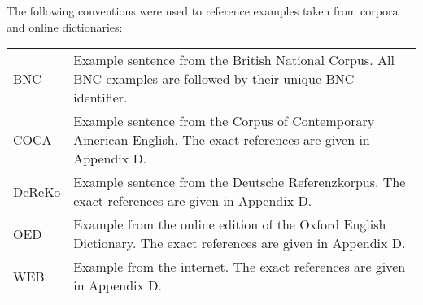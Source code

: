 
The following conventions were used to reference examples taken from corpora and online dictionaries:

\begin{table}[h]
\begin{tabular}{lp{9.5cm}} 
BNC        &    Example sentence from the British National Corpus. All BNC examples are followed by their unique BNC identifier. \\
COCA        &    Example sentence from the Corpus of Contemporary American English. The exact references are given in Appendix D.\\
DeReKo        &    Example sentence from the Deutsche Referenzkorpus. The exact references are given in Appendix D.\\
OED       &    Example from the online edition of the Oxford English Dictionary. The exact references are given in Appendix D. \\
WEB&Example from the internet. The exact references are given in Appendix D.
\end{tabular}
\end{table}
%

 
